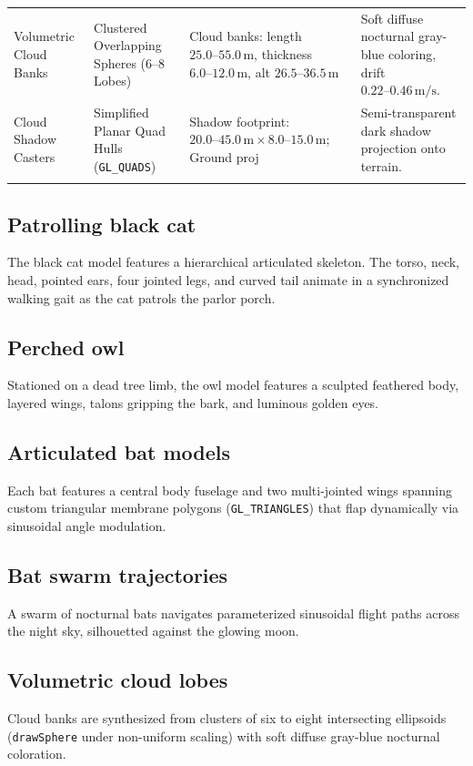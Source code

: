 \documentclass[10pt,a4paper,oneside]{article}
\begin{document}
\begin{longtable}{>{\raggedright\arraybackslash}p{}>{\raggedright\arraybackslash}p{}>{\raggedright\arraybackslash}p{}>{\raggedright\arraybackslash}p{}}
Volumetric Cloud Banks & Clustered Overlapping Spheres (6--8 Lobes) & 6 Cloud banks: length $25.0\text{--}55.0\,\mathrm{m}$, thickness $6.0\text{--}12.0\,\mathrm{m}$, alt $26.5\text{--}36.5\,\mathrm{m}$ & Soft diffuse nocturnal gray-blue coloring, drift $0.22\text{--}0.46\,\mathrm{m/s}$.\\\addlinespace[3pt]

Cloud Shadow Casters & Simplified Planar Quad Hulls (\texttt{GL\_QUADS}) & Shadow footprint: $20.0\text{--}45.0\,\mathrm{m} \times 8.0\text{--}15.0\,\mathrm{m}$; Ground proj & Semi-transparent dark shadow projection onto terrain.\\\addlinespace[3pt]

\bottomrule\end{longtable}

\subsection{Patrolling black cat}
The black cat model features a hierarchical articulated skeleton. The torso, neck, head, pointed ears, four jointed legs, and curved tail animate in a synchronized walking gait as the cat patrols the parlor porch.

\subsection{Perched owl}
Stationed on a dead tree limb, the owl model features a sculpted feathered body, layered wings, talons gripping the bark, and luminous golden eyes.

\subsection{Articulated bat models}
Each bat features a central body fuselage and two multi-jointed wings spanning custom triangular membrane polygons (\texttt{GL\_TRIANGLES}) that flap dynamically via sinusoidal angle modulation.

\subsection{Bat swarm trajectories}
A swarm of nocturnal bats navigates parameterized sinusoidal flight paths across the night sky, silhouetted against the glowing moon.

\subsection{Volumetric cloud lobes}
Cloud banks are synthesized from clusters of six to eight intersecting ellipsoids (\texttt{drawSphere} under non-uniform scaling) with soft diffuse gray-blue nocturnal coloration.
\end{document}
